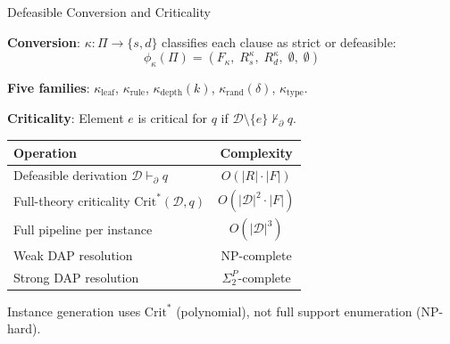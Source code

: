 \documentclass[aspectratio=169]{beamer}
\newcommand{\D}{\mathcal{D}}
\newcommand{\partfunc}{\kappa}
\newcommand{\pPartial}{\vdash_{\partial}}
\newcommand{\CritStar}{\mathrm{Crit}^{*}}
\begin{document}
\begin{frame}{Defeasible Conversion and Criticality}

\small
\textbf{Conversion}: $\partfunc: \Pi \to \{s, d\}$ classifies each clause as strict or defeasible:
\vspace{-0.3em}
\[
\phi_\partfunc(\Pi) = (F_\partfunc,\; R_s^{\partfunc},\; R_d^{\partfunc},\; \emptyset,\; \emptyset)
\]

\vspace{-0.5em}
\textbf{Five families}: $\partfunc_{\mathrm{leaf}}$, $\partfunc_{\mathrm{rule}}$, $\partfunc_{\mathrm{depth}}(k)$, $\partfunc_{\mathrm{rand}}(\delta)$, $\partfunc_{\mathrm{type}}$.

\vspace{0.2em}
\textbf{Criticality}: Element $e$ is critical for $q$ if $\D \setminus \{e\} \not\pPartial q$.

\vspace{0.2em}
\footnotesize
\begin{center}
\begin{tabular}{@{}lc@{}}
\toprule
Operation & Complexity \\
\midrule
Defeasible derivation $\D \pPartial q$ & $O(|R| \cdot |F|)$ \\
Full-theory criticality $\CritStar(\D, q)$ & $O(|\D|^2 \cdot |F|)$ \\
Full pipeline per instance & $O(|\D|^3)$ \\
Weak DAP resolution & NP-complete \\
Strong DAP resolution & $\Sigma_2^P$-complete \\
\bottomrule
\end{tabular}
\end{center}

\small
\vspace{0.2em}
Instance generation uses $\CritStar$ (polynomial), not full support enumeration (NP-hard).
\end{frame}
\end{document}
